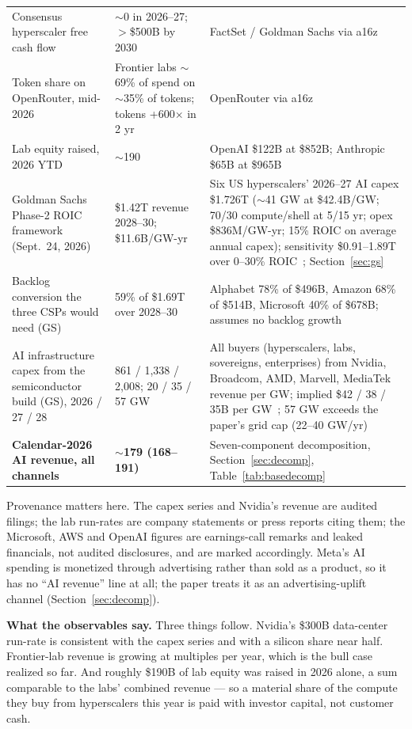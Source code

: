 \documentclass[11pt,letterpaper]{article}
\newcommand{\lead}[1]{{\color{leadwarm}\sffamily\bfseries #1}}
\begin{document}
\begin{xltabular}{\textwidth}{L{4.3cm}L{2.7cm}X}
Consensus hyperscaler free cash flow & $\sim$0 in 2026--27; $>$\$500B by 2030 & FactSet / Goldman Sachs via a16z~\cite{ref:a16z_som} \\
Token share on OpenRouter, mid-2026 & Frontier labs $\sim$69\% of spend on $\sim$35\% of tokens; tokens +600$\times$ in 2 yr & OpenRouter via a16z~\cite{ref:openrouter,ref:a16z_som} \\
Lab equity raised, 2026 YTD & $\sim$190 & OpenAI \$122B at \$852B; Anthropic \$65B at \$965B~\cite{ref:valueadd_openai,ref:techcrunch_anthropic} \\
Goldman Sachs Phase-2 ROIC framework (Sept.~24, 2026) & \$1.42T revenue 2028--30; \$11.6B/GW-yr & Six US hyperscalers' 2026--27 AI capex \$1.726T ($\sim$41 GW at \$42.4B/GW; 70/30 compute/shell at 5/15 yr; opex \$836M/GW-yr; 15\% ROIC on average annual capex); sensitivity \$0.91--1.89T over 0--30\% ROIC~\cite{ref:gs_roic2026}; Section~\ref{sec:gs} \\
Backlog conversion the three CSPs would need (GS) & 59\% of \$1.69T over 2028--30 & Alphabet 78\% of \$496B, Amazon 68\% of \$514B, Microsoft 40\% of \$678B; assumes no backlog growth~\cite{ref:gs_roic2026} \\
AI infrastructure capex from the semiconductor build (GS), 2026 / 27 / 28 & 861 / 1,338 / 2,008; 20 / 35 / 57 GW & All buyers (hyperscalers, labs, sovereigns, enterprises) from Nvidia, Broadcom, AMD, Marvell, MediaTek revenue per GW; implied \$42 / 38 / 35B per GW~\cite{ref:gs_roic2026}; 57 GW exceeds the paper's grid cap (22--40 GW/yr) \\
\midrule
\textbf{Calendar-2026 AI revenue, all channels} & \textbf{$\sim$179 (168--191)} & Seven-component decomposition, Section~\ref{sec:decomp}, Table~\ref{tab:basedecomp} \\

\end{xltabular}
\endgroup
Provenance matters here. The capex series and Nvidia's revenue are audited filings; the lab run-rates are company statements or press reports citing them; the Microsoft, AWS and OpenAI figures are earnings-call remarks and leaked financials, not audited disclosures, and are marked accordingly. Meta's AI spending is monetized through advertising rather than sold as a product, so it has no ``AI revenue'' line at all; the paper treats it as an advertising-uplift channel (Section~\ref{sec:decomp}).

\lead{What the observables say.} Three things follow. Nvidia's \$300B data-center run-rate is consistent with the capex series and with a silicon share near half. Frontier-lab revenue is growing at multiples per year, which is the bull case realized so far. And roughly \$190B of lab equity was raised in 2026 alone, a sum comparable to the labs' combined revenue --- so a material share of the compute they buy from hyperscalers this year is paid with investor capital, not customer cash.
\end{document}
